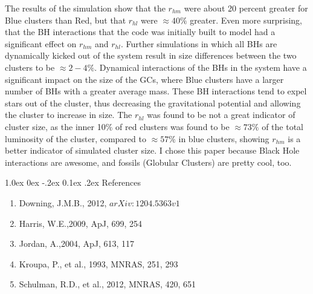 \documentclass[12pt]{article}
\makeatletter
\renewcommand\section{\@startsection {section}{1}{\z@}%
                                   {1.0ex \@plus 0ex \@minus -.2ex}%
                                   {0.1ex \@plus.2ex}%
                                   {\normalfont\large\bfseries}}
\newenvironment{changemargin}[2]{%
 \begin{list}{}{%
  \setlength{\topsep}{0pt}%
  \setlength{\leftmargin}{#1}%
  \setlength{\rightmargin}{#2}%
  \setlength{\listparindent}{\parindent}%
  \setlength{\itemindent}{\parindent}%
  \setlength{\parsep}{\parskip}%
 }%
\item[]}{\end{list}}
\makeatother
\begin{document}
The results of the simulation show that the $r_{hm}$ were about 20 percent greater for Blue clusters than Red, but that $r_{hl}$ were $\approx 40 \%$ greater. Even more surprising, that the BH interactions that the code was initially built to model had a significant effect on $r_{hm}$ and $r_{hl}$. Further simulations in which all BHs are dynamically kicked out of the system result in size differences between the two clusters to be $\approx 2-4 \%$. Dynamical interactions of the BHs in the system have a significant impact on the size of the GCs, where Blue clusters have a larger number of BHs with a greater average mass. These BH interactions tend to expel stars out of the cluster, thus decreasing the gravitational potential and allowing the cluster to increase in size. The $r_{hl}$ was found to be not a great indicator of cluster size, as the inner 10$\%$ of red clusters was found to be $\approx 73\%$ of the total luminosity of the cluster, compared to $\approx 57 \%$ in blue clusters, showing $r_{hm}$ is a better indicator of simulated cluster size. I chose this paper because Black Hole interactions are awesome, and fossils (Globular Clusters) are pretty cool, too.

\newpage

%
%
%

\section{References}

\vspace{-2ex}

\begin{references}
\begin{changemargin}{-2ex}{0ex}
\begin{enumerate}

\item
Downing, J.M.B., 2012, $arXiv:1204.5363v1$

\item
Harris, W.E.,2009, {ApJ}, 699, 254

\item
Jordan, A.,2004, {ApJ}, 613, 117

\item
Kroupa, P., et al., 1993, {MNRAS}, 251, 293

\item
Schulman, R.D., et al., 2012, {MNRAS}, 420, 651


\end{enumerate}

\end{changemargin}


\end{references}



\clearpage
\end{document}
